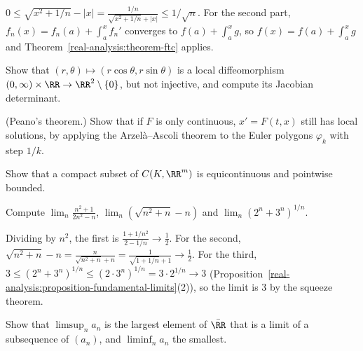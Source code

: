 \begin{solution}
$0 \leq \sqrt{x^2 + 1/n} - |x| = \frac{1/n}{\sqrt{x^2 + 1/n} + |x|} \leq 1/\sqrt{n}$. For the second part, $f_n(x) = f_n(a) + \int_a^xf_n'$ converges to $f(a) + \int_a^xg$, so $f(x) = f(a) + \int_a^xg$ and
Theorem~\ref{real-analysis:theorem-ftc} applies.
\end{solution}

\begin{exercise}\label{real-analysis:exercise-polar}
Show that $(r, \theta) \mapsto (r\cos\theta, r\sin\theta)$ is a local diffeomorphism $(0, \infty) \times \RR \to \RR^2 \setminus \{0\}$, but not injective, and compute its Jacobian determinant.
\end{exercise}

\begin{exercise}\label{real-analysis:exercise-peano}
(Peano's theorem.) Show that if $F$ is only continuous, $x' = F(t, x)$ still has local solutions, by applying the Arzel\`a--Ascoli theorem to the Euler polygons $\varphi_k$ with
step $1/k$.
\end{exercise}

\begin{exercise}\label{real-analysis:exercise-arzela-converse}
Show that a compact subset of $C(K, \RR^m)$ is equicontinuous and pointwise bounded.
\end{exercise}
\begin{exercise}\label{real-analysis:exercise-sequence-limits}
Compute $\lim_n\frac{n^2 + 1}{2n^2 - n}$, $\lim_n(\sqrt{n^2 + n} - n)$ and $\lim_n(2^n + 3^n)^{1/n}$.
\end{exercise}

\begin{solution}
Dividing by $n^2$, the first is $\frac{1 + 1/n^2}{2 - 1/n} \to \frac12$. For the second, $\sqrt{n^2 + n} - n = \frac{n}{\sqrt{n^2 + n} + n} = \frac{1}{\sqrt{1 + 1/n} + 1} \to \frac12$. For the third,
$3 \leq (2^n + 3^n)^{1/n} \leq (2 \cdot 3^n)^{1/n} = 3 \cdot 2^{1/n} \to 3$ (Proposition~\ref{real-analysis:proposition-fundamental-limits}(2)), so the limit is $3$ by the squeeze theorem.
\end{solution}

\begin{exercise}\label{real-analysis:exercise-limsup-subsequences}
Show that $\limsup_na_n$ is the largest element of $\bar{\RR}$ that is a limit of a subsequence of $(a_n)$, and $\liminf_na_n$ the smallest.
\end{exercise}

